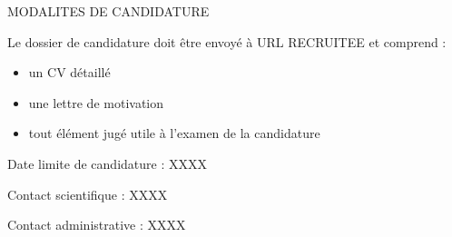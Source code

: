 \begin{graybox}{MODALITES DE CANDIDATURE }


Le dossier de candidature doit être envoyé à URL RECRUITEE et comprend : 

\begin{itemize}
        \item  un CV détaillé\cite{dummy}
        \item  une lettre de motivation
        \item  tout élément jugé utile à l’examen de la candidature 
\end{itemize}

Date limite de candidature : XXXX

Contact scientifique : XXXX

Contact administrative : XXXX

\end{graybox}




\vfill
\printbibliography[title=Bibliographie]